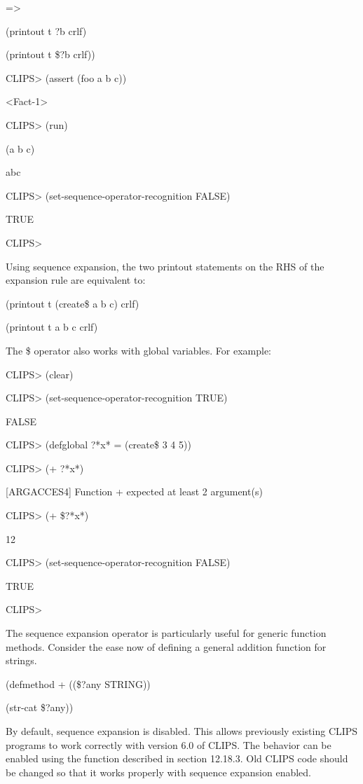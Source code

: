 \documentclass[letterpaper,10pt,english]{sphinxmanual}
\begin{document}
=\textgreater{}

(printout t ?b crlf)

(printout t \$?b crlf))

CLIPS\textgreater{} (assert (foo a b c))

\textless{}Fact-1\textgreater{}

CLIPS\textgreater{} (run)

(a b c)

abc

CLIPS\textgreater{} (set-sequence-operator-recognition FALSE)

TRUE

CLIPS\textgreater{}

Using sequence expansion, the two printout statements on the RHS of the
expansion rule are equivalent to:

(printout t (create\$ a b c) crlf)

(printout t a b c crlf)

The \$ operator also works with global variables. For example:

CLIPS\textgreater{} (clear)

CLIPS\textgreater{} (set-sequence-operator-recognition TRUE)

FALSE

CLIPS\textgreater{} (defglobal ?*x* = (create\$ 3 4 5))

CLIPS\textgreater{} (+ ?*x*)

{[}ARGACCES4{]} Function + expected at least 2 argument(s)

CLIPS\textgreater{} (+ \$?*x*)

12

CLIPS\textgreater{} (set-sequence-operator-recognition FALSE)

TRUE

CLIPS\textgreater{}

The sequence expansion operator is particularly useful for generic
function methods. Consider the ease now of defining a general addition
function for strings.

(defmethod + ((\$?any STRING))

(str-cat \$?any))

By default, sequence expansion is disabled. This allows previously
existing CLIPS programs to work correctly with version 6.0 of CLIPS. The
behavior can be enabled using the 
function described in section 12.18.3. Old CLIPS code should be changed
so that it works properly with sequence expansion enabled.
\end{document}
